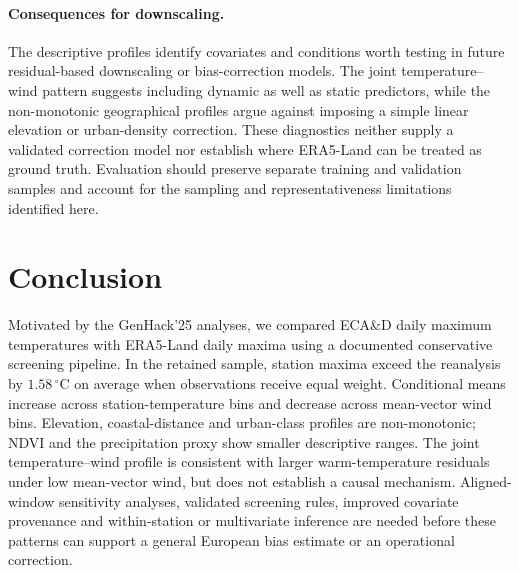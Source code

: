 \documentclass[a4paper,12pt,leqno]{article}
\begin{document}
\paragraph{Consequences for downscaling.}
The descriptive profiles identify covariates and conditions worth testing
in future residual-based downscaling or bias-correction models. The joint
temperature--wind pattern suggests including dynamic as well as static
predictors, while the non-monotonic geographical profiles argue against
imposing a simple linear elevation or urban-density correction. These
diagnostics neither supply a validated correction model nor establish
where ERA5-Land can be treated as ground truth. Evaluation should preserve
separate training and validation samples and account for the sampling and
representativeness limitations identified here.

\section{Conclusion}
\label{sec:conclusion}

Motivated by the GenHack'25 analyses, we compared ECA\&D daily maximum
temperatures with ERA5-Land daily maxima using a documented conservative
screening pipeline. In the retained sample, station maxima exceed the
reanalysis by $1.58\,^\circ$C on average when observations receive equal
weight. Conditional means increase across station-temperature bins and
decrease across mean-vector wind bins. Elevation, coastal-distance and
urban-class profiles are non-monotonic; NDVI and the precipitation proxy
show smaller descriptive ranges. The joint temperature--wind profile
is consistent with larger warm-temperature residuals under low mean-vector
wind, but does not establish a causal mechanism. Aligned-window sensitivity
analyses, validated screening rules, improved covariate provenance and
within-station or multivariate inference are needed before these patterns
can support a general European bias estimate or an operational correction.

\printbibliography
\end{document}
